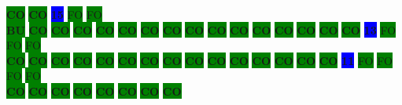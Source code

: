 \colorbox{green}{\color[rgb]{0,0,0}\textbf{CO}}%
\colorbox{green}{\color[rgb]{0,0,0}\textbf{CO}}%
\colorbox{blue}{\color[rgb]{1,0,0}\textbf{15}}%
\colorbox{green}{\color[gray]{0.75}FO}%
\colorbox{green}{\color[gray]{0.75}FO}%
\\
\colorbox{green}{\color[rgb]{1,0,0}\textbf{BU}}%
\colorbox{green}{\color[rgb]{0,0,0}\textbf{CO}}%
\colorbox{green}{\color[rgb]{0,0,0}\textbf{CO}}%
\colorbox{green}{\color[rgb]{0,0,0}\textbf{CO}}%
\colorbox{green}{\color[rgb]{0,0,0}\textbf{CO}}%
\colorbox{green}{\color[rgb]{0,0,0}\textbf{CO}}%
\colorbox{green}{\color[rgb]{0,0,0}\textbf{CO}}%
\colorbox{green}{\color[rgb]{0,0,0}\textbf{CO}}%
\colorbox{green}{\color[rgb]{0,0,0}\textbf{CO}}%
\colorbox{green}{\color[rgb]{0,0,0}\textbf{CO}}%
\colorbox{green}{\color[rgb]{0,0,0}\textbf{CO}}%
\colorbox{green}{\color[rgb]{0,0,0}\textbf{CO}}%
\colorbox{green}{\color[rgb]{0,0,0}\textbf{CO}}%
\colorbox{green}{\color[rgb]{0,0,0}\textbf{CO}}%
\colorbox{green}{\color[rgb]{0,0,0}\textbf{CO}}%
\colorbox{green}{\color[rgb]{0,0,0}\textbf{CO}}%
\colorbox{blue}{\color[rgb]{1,0,0}\textbf{13}}%
\colorbox{green}{\color[gray]{0.75}FO}%
\colorbox{green}{\color[gray]{0.75}FO}%
\colorbox{green}{\color[gray]{0.75}FO}%
\\
\colorbox{green}{\color[rgb]{0,0,0}\textbf{CO}}%
\colorbox{green}{\color[rgb]{0,0,0}\textbf{CO}}%
\colorbox{green}{\color[rgb]{0,0,0}\textbf{CO}}%
\colorbox{green}{\color[rgb]{0,0,0}\textbf{CO}}%
\colorbox{green}{\color[rgb]{0,0,0}\textbf{CO}}%
\colorbox{green}{\color[rgb]{0,0,0}\textbf{CO}}%
\colorbox{green}{\color[rgb]{0,0,0}\textbf{CO}}%
\colorbox{green}{\color[rgb]{0,0,0}\textbf{CO}}%
\colorbox{green}{\color[rgb]{0,0,0}\textbf{CO}}%
\colorbox{green}{\color[rgb]{0,0,0}\textbf{CO}}%
\colorbox{green}{\color[rgb]{0,0,0}\textbf{CO}}%
\colorbox{green}{\color[rgb]{0,0,0}\textbf{CO}}%
\colorbox{green}{\color[rgb]{0,0,0}\textbf{CO}}%
\colorbox{green}{\color[rgb]{0,0,0}\textbf{CO}}%
\colorbox{green}{\color[rgb]{0,0,0}\textbf{CO}}%
\colorbox{blue}{\color[rgb]{1,0,0}\textbf{11}}%
\colorbox{green}{\color[gray]{0.75}FO}%
\colorbox{green}{\color[gray]{0.75}FO}%
\colorbox{green}{\color[gray]{0.75}FO}%
\colorbox{green}{\color[gray]{0.75}FO}%
\\
\colorbox{green}{\color[rgb]{0,0,0}\textbf{CO}}%
\colorbox{green}{\color[rgb]{0,0,0}\textbf{CO}}%
\colorbox{green}{\color[rgb]{0,0,0}\textbf{CO}}%
\colorbox{green}{\color[rgb]{0,0,0}\textbf{CO}}%
\colorbox{green}{\color[rgb]{0,0,0}\textbf{CO}}%
\colorbox{green}{\color[rgb]{0,0,0}\textbf{CO}}%
\colorbox{green}{\color[rgb]{0,0,0}\textbf{CO}}%
\colorbox{green}{\color[rgb]{0,0,0}\textbf{CO}}%
